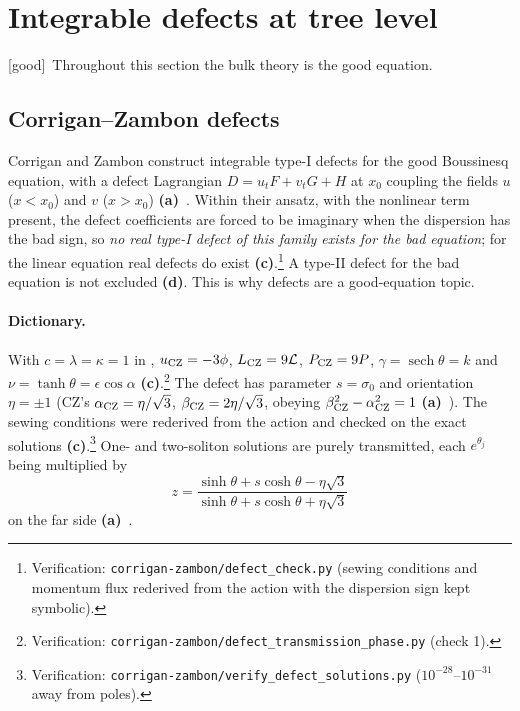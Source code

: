 \documentclass[11pt,a4paper]{article}
\newcommand{\lab}[1]{{\normalfont\sffamily\footnotesize\bfseries(#1)}}
\newcommand{\La}{\lab{a}}
\newcommand{\Lc}{\lab{c}}
\newcommand{\Ld}{\lab{d}}
\newcommand{\eqtag}[2]{{\normalfont\sffamily\footnotesize\textcolor{#1}{[#2]}}}
\newcommand{\Good}{\eqtag{teal!70!black}{good}}
\newcommand{\scr}[1]{\nolinkurl{#1}}
\newcommand{\chk}[1]{\footnote{\raggedright Verification: #1.}}
\newcommand{\sech}{\operatorname{sech}}
\theoremstyle{remark}
\begin{document}
\section{Integrable defects at tree level}\label{sec:defects}

\Good\ Throughout this section the bulk theory is the good equation.

\subsection{Corrigan--Zambon defects}

Corrigan and Zambon construct integrable type-I defects for the good Boussinesq equation, with a defect Lagrangian $D=u_tF+v_tG+H$ at $x_0$ coupling the fields $u$ ($x<x_0$) and $v$ ($x>x_0$) \La~\cite{CZ}. Within their ansatz, with the nonlinear term present, the defect coefficients are forced to be imaginary when the dispersion has the bad sign, so \emph{no real type-I defect of this family exists for the bad equation}; for the linear equation real defects do exist \Lc.\chk{\scr{corrigan-zambon/defect_check.py} (sewing conditions and momentum flux rederived from the action with the dispersion sign kept symbolic)} A type-II defect for the bad equation is not excluded \Ld. This is why defects are a good-equation topic.

\paragraph{Dictionary.} With $c=\lambda=\kappa=1$ in \cite{CZ}, $u_{\rm CZ}=-3\phi$, $L_{\rm CZ}=9\mathcal L$, $P_{\rm CZ}=9P$, $\gamma=\sech\theta=k$ and $\nu=\tanh\theta=\epsilon\cos\alpha$ \Lc.\chk{\scr{corrigan-zambon/defect_transmission_phase.py} (check 1)} The defect has parameter $s=\sigma_0$ and orientation $\eta=\pm1$ (CZ's $\alpha_{\rm CZ}=\eta/\sqrt3$, $\beta_{\rm CZ}=2\eta/\sqrt3$, obeying $\beta_{\rm CZ}^2-\alpha_{\rm CZ}^2=1$ \La~\cite[(3.22),(3.37)]{CZ}). The sewing conditions were rederived from the action and checked on the exact solutions \Lc.\chk{\scr{corrigan-zambon/verify_defect_solutions.py} ($10^{-28}$--$10^{-31}$ away from poles)} One- and two-soliton solutions are purely transmitted, each $e^{\theta_j}$ being multiplied by
\begin{equation}\label{eq:zCZ}
z=\frac{\sinh\theta+s\cosh\theta-\eta\sqrt3}{\sinh\theta+s\cosh\theta+\eta\sqrt3}
\end{equation}
on the far side \La~\cite[(5.5),(5.11)]{CZ}.
\end{document}
